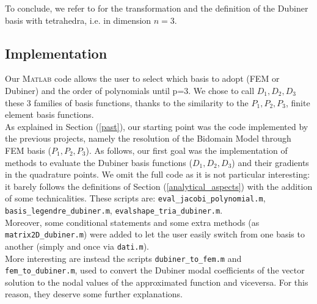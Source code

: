 \documentclass[a4paper,11pt]{article}
\begin{document}
    \noindent To conclude, we refer to \cite{sherwin} for the transformation and the definition of the Dubiner basis with tetrahedra, i.e. in dimension $n=3$.
    
    \subsection{Implementation}
    Our \textsc{Matlab} code allows the user to select which basis to adopt (FEM or Dubiner) and the order of polynomials until p=3. We chose to call $D_1,D_2,D_3$ these 3 families of basis functions, thanks to the similarity to the $P_1,P_2,P_3$, finite element basis functions.\\
    As explained in Section (\ref{past}), our starting point was the code implemented by the previous projects, namely the resolution of the Bidomain Model through FEM basis ($P_1,P_2,P_3$). As follows, our first goal was the implementation of methods to evaluate the Dubiner basis functions ($D_1,D_2,D_3$) and their gradients in the quadrature points. We omit the full code as it is not particular interesting: it barely follows the definitions of Section (\ref{analytical_aspects}) with the addition of some technicalities. These scripts are: \texttt{eval\_jacobi\_polynomial.m}, \texttt{basis\_legendre\_dubiner.m}, \texttt{evalshape\_tria\_dubiner.m}.\\
    
    \noindent Moreover, some conditional statements and some extra methods (as \texttt{matrix2D\_dubiner.m}) were added to let the user easily switch from one basis to another (simply and once via \texttt{dati.m}). \\
    
    \noindent More interesting are instead the scripts \texttt{dubiner\_to\_fem.m} and \texttt{fem\_to\_dubiner.m}, used to convert the Dubiner modal coefficients of the vector solution to the nodal values of the approximated function and viceversa. For this reason, they deserve some further explanations.
\end{document}
